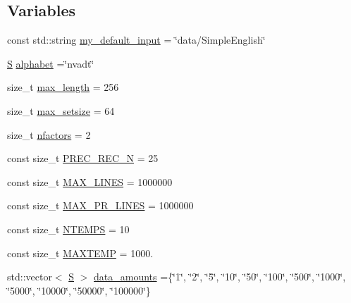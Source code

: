 \subsection*{Variables}
\begin{DoxyCompactItemize}
\item 
const std\+::string \hyperlink{_formal_language_theory-_complex_2_main_8cpp_aff5a98e66ee22e2c2547530190ecfd3d}{my\+\_\+default\+\_\+input} = \char`\"{}data/Simple\+English\char`\"{}
\item 
\hyperlink{_formal_language_theory-_complex_2_main_8cpp_a51c40915539205f0b5add30b0d68a4cb}{S} \hyperlink{_formal_language_theory-_complex_2_main_8cpp_ad762aabf5f551e4c7632fb389b3e2209}{alphabet} =\char`\"{}nvadt\char`\"{}
\item 
size\+\_\+t \hyperlink{_formal_language_theory-_complex_2_main_8cpp_aa94da4036d516add23ae35c670300c32}{max\+\_\+length} = 256
\item 
size\+\_\+t \hyperlink{_formal_language_theory-_complex_2_main_8cpp_aafa4cc7b8a249ecb81ad63ca7a2a6150}{max\+\_\+setsize} = 64
\item 
size\+\_\+t \hyperlink{_formal_language_theory-_complex_2_main_8cpp_abbce8dbfea6f30b87265ddd94cb933f7}{nfactors} = 2
\item 
const size\+\_\+t \hyperlink{_formal_language_theory-_complex_2_main_8cpp_a948185958f7efc05b85ac4084d82e3b9}{P\+R\+E\+C\+\_\+\+R\+E\+C\+\_\+N} = 25
\item 
const size\+\_\+t \hyperlink{_formal_language_theory-_complex_2_main_8cpp_a40344102d720622016c257aa59a33b6d}{M\+A\+X\+\_\+\+L\+I\+N\+ES} = 1000000
\item 
const size\+\_\+t \hyperlink{_formal_language_theory-_complex_2_main_8cpp_a5923038d8dfed7c8eaac4111396b490f}{M\+A\+X\+\_\+\+P\+R\+\_\+\+L\+I\+N\+ES} = 1000000
\item 
const size\+\_\+t \hyperlink{_formal_language_theory-_complex_2_main_8cpp_a6aa2c568bc3a4f1e1f586980b31b6699}{N\+T\+E\+M\+PS} = 10
\item 
const size\+\_\+t \hyperlink{_formal_language_theory-_complex_2_main_8cpp_aa34d3d5e11e3f8deb784edc7bca023bb}{M\+A\+X\+T\+E\+MP} = 1000.
\item 
std\+::vector$<$ \hyperlink{_formal_language_theory-_complex_2_main_8cpp_a51c40915539205f0b5add30b0d68a4cb}{S} $>$ \hyperlink{_formal_language_theory-_complex_2_main_8cpp_acb338cf650cba49a5be5dabfffad0dbd}{data\+\_\+amounts} =\{\char`\"{}1\char`\"{}, \char`\"{}2\char`\"{}, \char`\"{}5\char`\"{}, \char`\"{}10\char`\"{}, \char`\"{}50\char`\"{}, \char`\"{}100\char`\"{}, \char`\"{}500\char`\"{}, \char`\"{}1000\char`\"{}, \char`\"{}5000\char`\"{}, \char`\"{}10000\char`\"{}, \char`\"{}50000\char`\"{}, \char`\"{}100000\char`\"{}\}

\end{DoxyCompactItemize}
